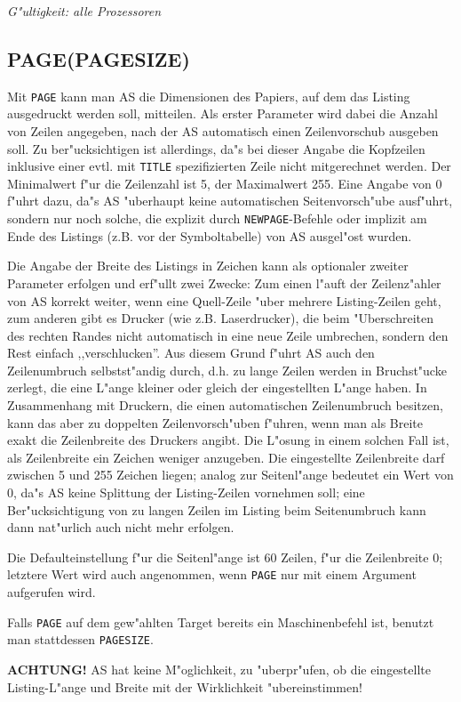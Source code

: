 \documentclass[12pt,a4paper,twoside]{report}
\makeatletter
\newcommand{\bb}[1]{{\bf #1}}
\newcommand{\tty}[1]{{\tt #1}}
\newcommand{\ttindex}[1]{\index{#1@{\tt #1}}}
\makeatother
\begin{document}
{\em G"ultigkeit: alle Prozessoren}


\subsection{PAGE(PAGESIZE)}
\ttindex{PAGE}\ttindex{PAGESIZE}

Mit \tty{PAGE} kann man AS die Dimensionen des Papiers, auf dem das
Listing ausgedruckt werden soll, mitteilen.  Als erster Parameter
wird dabei die Anzahl von Zeilen angegeben, nach der AS automatisch
einen Zeilenvorschub ausgeben soll.  Zu ber"ucksichtigen ist allerdings,
da"s bei dieser Angabe die Kopfzeilen inklusive einer evtl. mit \tty{TITLE}
spezifizierten Zeile nicht mitgerechnet werden.  Der Minimalwert f"ur
die Zeilenzahl ist 5, der Maximalwert 255.  Eine Angabe von 0 f"uhrt dazu,
da"s AS "uberhaupt keine automatischen Seitenvorsch"ube ausf"uhrt, sondern
nur noch solche, die explizit durch \tty{NEWPAGE}-Befehle oder implizit am
Ende des Listings (z.B. vor der Symboltabelle) von AS ausgel"ost
wurden.
\par
Die Angabe der Breite des Listings in Zeichen kann als optionaler
zweiter Parameter erfolgen und erf"ullt zwei Zwecke: Zum einen l"auft
der Zeilenz"ahler von AS korrekt weiter, wenn eine Quell-Zeile "uber mehrere
Listing-Zeilen geht, zum anderen gibt es Drucker (wie z.B. Laserdrucker),
die beim "Uberschreiten des rechten Randes nicht automatisch in eine neue
Zeile umbrechen, sondern den Rest einfach ,,verschlucken''.  Aus diesem
Grund f"uhrt AS auch den Zeilenumbruch selbstst"andig durch, d.h. zu lange
Zeilen werden in Bruchst"ucke zerlegt, die eine L"ange kleiner oder
gleich der eingestellten L"ange haben.  In Zusammenhang mit Druckern, die
einen automatischen Zeilenumbruch besitzen, kann das aber zu doppelten
Zeilenvorsch"uben f"uhren, wenn man als Breite exakt die Zeilenbreite des
Druckers angibt.  Die L"osung in einem solchen Fall ist, als Zeilenbreite
ein Zeichen weniger anzugeben.  Die eingestellte Zeilenbreite darf zwischen
5 und 255 Zeichen liegen; analog zur Seitenl"ange bedeutet ein Wert von 0,
da"s AS keine Splittung der Listing-Zeilen vornehmen soll; eine
Ber"ucksichtigung von zu langen Zeilen im Listing beim Seitenumbruch kann
dann nat"urlich auch nicht mehr erfolgen.
\par
Die Defaulteinstellung f"ur die Seitenl"ange ist 60 Zeilen, f"ur die
Zeilenbreite 0; letztere Wert wird auch angenommen, wenn \tty{PAGE} nur mit
einem Argument aufgerufen wird.
\par
Falls \tty{PAGE} auf dem gew"ahlten Target bereits ein
Maschinenbefehl ist, benutzt man stattdessen \tty{PAGESIZE}.
\par
\bb{ACHTUNG!} AS hat keine M"oglichkeit, zu "uberpr"ufen, ob die
eingestellte Listing-L"ange und Breite mit der Wirklichkeit "ubereinstimmen!
\end{document}
